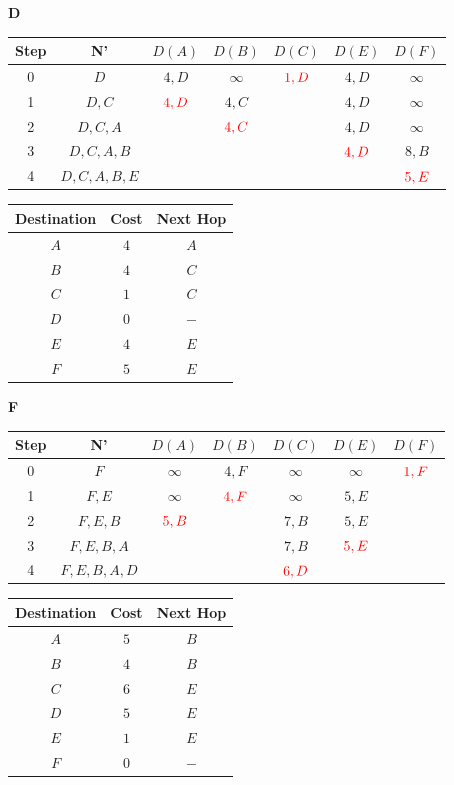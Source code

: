 \documentclass[10pt]{article}
\begin{document}
			\begin{center}
				\textbf{D}
				\begin{tabular}{||c c c c c c c||} 
					\hline
					Step & N' & $D(A)$ & $D(B)$ & $D(C)$ & $D(E)$ & $D(F)$ \\[0.5ex] 
					\hline\hline
					0 & $D$ & $4,D$ & $\infty$ & $\color{red} 1,D$ & $4,D$ & $\infty$ \\
					\hline
					1 & $D,C$ & $\color{red} 4,D$ & $4,C$ & & $4,D$ & $\infty$ \\
					\hline
					2 & $D,C,A$ & & $\color{red} 4,C$ & & $4,D$ & $\infty$ \\
					\hline
					3 & $D,C,A,B$ & & & & $\color{red} 4,D$ & $8,B$ \\
					\hline
					4 & $D,C,A,B,E$ & & & & & $\color{red} 5,E$ \\[0.5ex]  
					\hline
				\end{tabular}
				\quad
				\begin{tabular}{||c || c || c||}
					\hline
					Destination & Cost & Next Hop \\[0.5ex] 
					\hline\hline
					$A$ & $4$ & $A$ \\
					$B$ & $4$ & $C$ \\
					$C$ & $1$ & $C$ \\
					$D$ & $0$ & $-$ \\
					$E$ & $4$ & $E$ \\
					$F$ & $5$ & $E$ \\[0.5ex]
					\hline
				\end{tabular}
			\end{center}
			
			\begin{center}
				\textbf{F}
				\begin{tabular}{||c c c c c c c||} 
					\hline
					Step & N' & $D(A)$ & $D(B)$ & $D(C)$ & $D(E)$ & $D(F)$ \\[0.5ex] 
					\hline\hline
					0 & $F$ & $\infty$ & $4,F$ & $\infty$ & $\infty$ & $\color{red} 1,F$ \\
					\hline
					1 & $F,E$ & $\infty$ & $\color{red} 4,F$ & $\infty$ & $5,E$  & \\
					\hline
					2 & $F,E,B$ & $\color{red} 5,B$ & & $7,B$ & $5,E$ & \\
					\hline
					3 & $F,E,B,A$ & & & $7,B$ & $\color{red} 5,E$ & \\
					\hline
					4 & $F,E,B,A,D$ & & & $\color{red} 6,D$ & & \\[0.5ex]  
					\hline
				\end{tabular}
				\quad
				\begin{tabular}{||c || c || c||}
					\hline
					Destination & Cost & Next Hop \\[0.5ex] 
					\hline\hline
					$A$ & $5$ & $B$ \\
					$B$ & $4$ & $B$ \\
					$C$ & $6$ & $E$ \\
					$D$ & $5$ & $E$ \\
					$E$ & $1$ & $E$ \\
					$F$ & $0$ & $-$ \\[0.5ex]
					\hline
				\end{tabular}
			\end{center}
		
\end{document}
